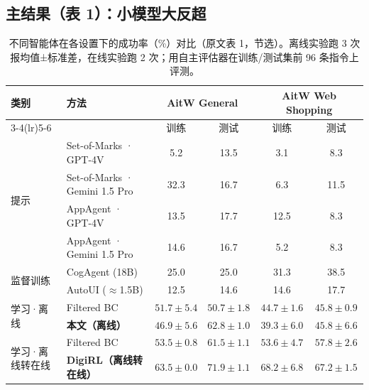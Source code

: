 \documentclass[11pt,UTF8,fontset=fandol]{ctexart}
\begin{document}
\subsection*{主结果（表 1）：小模型大反超}

\begin{table}[H]\centering
\caption{不同智能体在各设置下的成功率（\%）对比（原文表 1，节选）。离线实验跑 3 次报均值±标准差，在线实验跑 2 次；用自主评估器在训练/测试集前 96 条指令上评测。}
\begin{tabular}{llcccc}
\toprule
\multirow{2}{*}{类别} & \multirow{2}{*}{方法} & \multicolumn{2}{c}{AitW General} & \multicolumn{2}{c}{AitW Web Shopping} \\
\cmidrule(lr){3-4}\cmidrule(lr){5-6}
 & & 训练 & 测试 & 训练 & 测试 \\
\midrule
\multirow{4}{*}{提示} & Set-of-Marks · GPT-4V & 5.2 & 13.5 & 3.1 & 8.3 \\
 & Set-of-Marks · Gemini 1.5 Pro & 32.3 & 16.7 & 6.3 & 11.5 \\
 & AppAgent · GPT-4V & 13.5 & 17.7 & 12.5 & 8.3 \\
 & AppAgent · Gemini 1.5 Pro & 14.6 & 16.7 & 5.2 & 8.3 \\
\midrule
\multirow{2}{*}{监督训练} & CogAgent (18B) & 25.0 & 25.0 & 31.3 & 38.5 \\
 & AutoUI ($\approx$1.5B) & 12.5 & 14.6 & 14.6 & 17.7 \\
\midrule
\multirow{2}{*}{学习·离线} & Filtered BC & $51.7\pm5.4$ & $50.7\pm1.8$ & $44.7\pm1.6$ & $45.8\pm0.9$ \\
 & \textbf{本文（离线）} & $46.9\pm5.6$ & $62.8\pm1.0$ & $39.3\pm6.0$ & $45.8\pm6.6$ \\
\midrule
\multirow{2}{*}{学习·离线转在线} & Filtered BC & $53.5\pm0.8$ & $61.5\pm1.1$ & $53.6\pm4.7$ & $57.8\pm2.6$ \\
 & \textbf{DigiRL（离线转在线）} & $\mathbf{63.5\pm0.0}$ & $\mathbf{71.9\pm1.1}$ & $\mathbf{68.2\pm6.8}$ & $\mathbf{67.2\pm1.5}$ \\
\bottomrule
\end{tabular}
\end{table}
\end{document}
